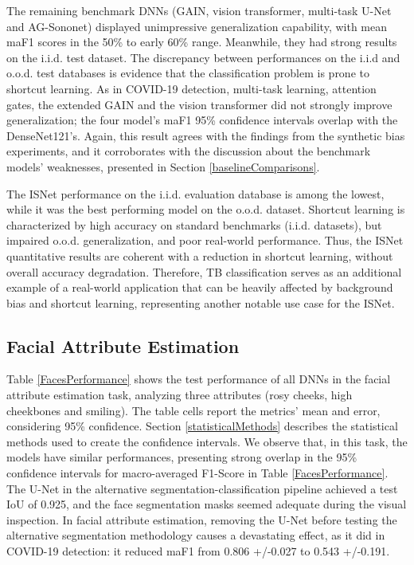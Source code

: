 \documentclass[fleqn,10pt]{wlscirep}
\begin{document}
{The remaining benchmark DNNs (GAIN, vision transformer, multi-task U-Net and AG-Sononet) displayed unimpressive generalization capability, with mean maF1 scores in the 50\% to early 60\% range. Meanwhile, they had strong results on the i.i.d. test dataset. The discrepancy between performances on the i.i.d and o.o.d. test databases is evidence that the classification problem is prone to shortcut learning. As in COVID-19 detection, multi-task learning, attention gates, the extended GAIN and the vision transformer did not strongly improve generalization; the four model's maF1 95\% confidence intervals overlap with the DenseNet121's. Again, this result agrees with the findings from the synthetic bias experiments, and it corroborates with the discussion about the benchmark models' weaknesses, presented in Section \ref{baselineComparisons}.

The ISNet performance on the i.i.d. evaluation database is among the lowest, while it was the best performing model on the o.o.d. dataset. Shortcut learning is characterized by high accuracy on standard benchmarks (i.i.d. datasets), but impaired o.o.d. generalization, and poor real-world performance\cite{ShortcutLearning}. Thus, the ISNet quantitative results are coherent with a reduction in shortcut learning, without overall accuracy degradation. Therefore, TB classification serves as an additional example of a real-world application that can be heavily affected by background bias and shortcut learning, representing another notable use case for the ISNet.

\subsection{Facial Attribute Estimation}

Table \ref{FacesPerformance} shows the test performance of all DNNs in the facial attribute estimation task, analyzing three attributes (rosy cheeks, high cheekbones and smiling). The table cells report the metrics' mean and error, considering 95\% confidence. Section \ref{statisticalMethods} describes the statistical methods used to create the confidence intervals. We observe that, in this task, the models have similar performances, presenting strong overlap in the 95\% confidence intervals for macro-averaged F1-Score in Table \ref{FacesPerformance}. The U-Net in the alternative segmentation-classification pipeline achieved a test IoU of 0.925, and the face segmentation masks seemed adequate during the visual inspection. In facial attribute estimation, removing the U-Net before testing the alternative segmentation methodology causes a devastating effect, as it did in COVID-19 detection: it reduced maF1 from 0.806 +/-0.027 to 0.543 +/-0.191. 

}
\end{document}

